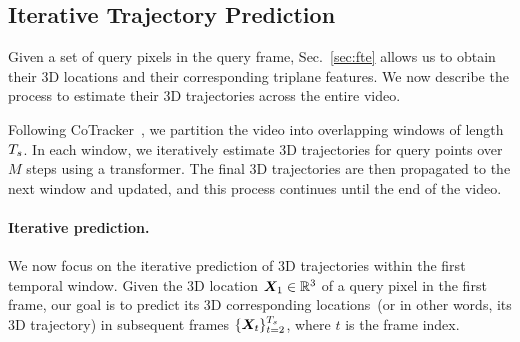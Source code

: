 


\subsection{Iterative Trajectory Prediction}
\label{sec:Iterative}
Given a set of query pixels in the query frame, Sec.~\ref{sec:fte} allows us to obtain their 3D locations and their corresponding triplane features. We now describe the process to estimate their 3D trajectories across the entire video. 

Following CoTracker~\cite{cotracker}, we partition the video into overlapping windows of length $T_s$. In each window, we iteratively estimate 3D trajectories for query points over $M$ steps using a transformer.  The final 3D trajectories are then propagated to the next window and updated, and this process continues until the end of the video.

\vspace{-1em}
\paragraph{Iterative prediction.} We now focus on the iterative prediction of 3D trajectories within the first temporal window. Given the 3D location $\bm{X}_1\in\mathbb R^3$ of a query pixel in the first frame, our goal is to predict its 3D corresponding locations~(or in other words, its 3D trajectory) in subsequent frames $\{\bm{X}_t\}_{t=2}^{T_s}$, where $t$ is the frame index.

